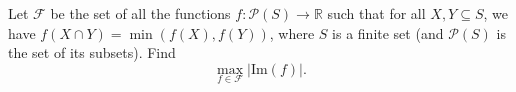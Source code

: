 Let $\mathcal{F}$ be the set of all the functions $f : \mathcal{P}(S) \longrightarrow \mathbb{R}$ such that for all $X, Y \subseteq S$, we have $f(X \cap Y) = \min (f(X), f(Y))$, where $S$ is a finite set (and $\mathcal{P}(S)$ is the set of its subsets). Find
\[\max_{f \in \mathcal{F}}| \textrm{Im}(f) |. \]